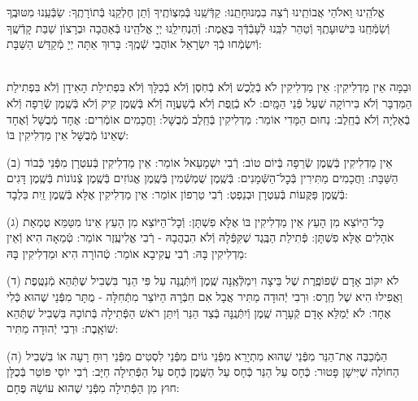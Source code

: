 \documentclass[twoside, openany, parskip=half, 11pt]{book}
\begin{document}
אֱלֹהֵֽינוּ וֵאלֹהֵי אֲבוֹתֵֽינוּ רְֿצֵה בִמְנוּחָתֵֽנוּ: קַדְּֿשֵֽׁנוּ בְּֿמִצְוֹתֶֽיךָ וְֿתֵן חֶלְקֵֽנוּ בְּֿתוֹרָתֶֽךָ: שַׂבְּֿעֵֽנוּ מִטּוּבֶֽךָ וְֿשַׂמְּֿחֵֽנוּ בִּישׁוּעָתֶֽךָ וְֿטַהֵר לִבֵּֽנוּ לְֿעָבְֿדְּֿךָ בֶּאֱמֶת: וְֿהַנְחִילֵֽנוּ יְיָ אֱלֹהֵֽינוּ בְּֿאַהֲבָה וּבְרָצוֹן שַׁבַּת קָדְֿשֶֽׁךָ וְֿיִשְׂמְֿחוּ בְֿךָ יִשְׂרָאֵל אוֹהֲבֵי שְֿׁמֶֽךָ: בָּרוּךְ אַתָּה יְיָ מְֿקַדֵּשׁ הַשַּׁבָּת:

\fullkaddish




\\
וּבַמָּה אֵין מַדְלִיקִין: אֵין מַדְלִיקִין לֹא בְֿלֶֽכֶשׁ וְֿלֹא בְֿחֹֽסֶן וְֿלֹא בְֿכַלָּךְ וְֿלֹא בִּפְתִילַת הָאִידָן וְֿלֹא בִּפְתִילַת הַמִּדְבָּר וְֿלֹא בִּירוֹקָה שֶׁעַל פְּֿנֵי הַמָּֽיִם: לֹא בְֿזֶֽפֶת וְֿלֹא בְֿשַׁעֲוָה וְֿלֹא בְּֿשֶֽׁמֶן קִיק וְֿלֹא בְּֿשֶֽׁמֶן שְֿׂרֵפָה וְֿלֹא בְֿאַלְיָה וְֿלֹא בְֿחֵֽלֶב: נַחוּם הַמָּדִי אוֹמֵר: מַדְלִיקִין בְּֿחֵֽלֶב מְֿבֻשָּׁל: וַחֲכָמִים אוֹמְֿרִים: אֶחָד מְֿבֻשָּׁל וְֿאֶחָד שֶׁאֵינוֹ מְֿבֻשָּׁל אֵין מַדְלִיקִין בּוֹ:

(ב) אֵין מַדְלִיקִין בְּֿשֶֽׁמֶן שְֿׂרֵפָה בְּֿיוֹם טוֹב: רְֿבִי יִשְׁמָעֵאל אוֹמֵר: אֵין מַדְלִיקִין בְּֿעִטְרָן מִפְּֿנֵי כְּֿבוֹד הַשַּׁבָּת: וַחֲכָמִים מַתִּירִין בְּֿכׇל־הַשְּֿׁמָנִים: בְּֿשֶֽׁמֶן שֻׁמְשְֿׁמִין בְּֿשֶֽׁמֶן אֱגוֹזִים בְּֿשֶֽׁמֶן צְֿנוֹנוֹת בְּֿשֶֽׁמֶן דָּגִים בְּֿשֶֽׁמֶן פַּקֻּעוֹת בְּֿעִטְרָן וּבְנֵפְטְ: רְֿבִי טַרְפוֹן אוֹמֵר: אֵין מַדְלִיקִין אֶלָּא בְּֿשֶֽׁמֶן זַֽיִת בִּלְבָד:

(ג) כׇּל־הַיּוֹצֵא מִן הָעֵץ אֵין מַדְלִיקִין בּוֹ אֶלָּא פִשְׁתָּן: וְֿכׇל־הַיּוֹצֵא מִן הָעֵץ אֵינוֹ מִטַּמֵּא טֻמְאַת אֹהָלִים אֶלָּא פִשְׁתָּן: פְּֿתִילַת הַבֶּֽגֶד שֶׁקִּפְּֿלָהּ וְֿלֹא הִבְהֲבָהּ - רְֿבִי אֱלִיעֶֽזֶר אוֹמֵר: טְֿמֵאָה הִיא וְֿאֵין מַדְלִיקִין בָּהּ: רְֿבִי עֲקִיבָא אוֹמֵר: טְֿהוֹרָה הִיא וּמַדְלִיקִין בָּהּ:

(ד) לֹא יִקּוֹב אָדָם שְֿׁפוֹפֶֽרֶת שֶׁל בֵּיצָה וִימַלְּֿאֶֽנָּה שֶֽׁמֶן וְֿיִתְּֿנֶֽנָּה עַל פִּי הַנֵּר בִּשְׁבִיל שֶׁתְּֿהֵא מְֿנַטֶּֽפֶת וַאֲפִילוּ הִיא שֶׁל חֶֽרֶס: וּרְבִי יְֿהוּדָה מַתִּיר אֲבָל אִם חִבְּֿרָהּ הַיּוֹצֵר מִתְּֿחִלָּה - מֻתָּר מִפְּֿנֵי שֶׁהוּא כְּֿלִי אֶחָד: לֹא יְֿמַלֵּא אָדָם קְֿעָרָה שֶֽׁמֶן וְֿיִתְּֿנֶֽנָּה בְּֿצַד הַנֵּר וְֿיִתֵּן רֹאשׁ הַפְּֿתִילָה בְּֿתוֹכָהּ בִּשְׁבִיל שֶׁתְּֿהֵא שׁוֹאָֽבֶת: וּרְבִי יְֿהוּדָה מַתִּיר:

(ה) הַמְֿכַבֶּה אֶת־הַנֵּר מִפְּֿנֵי שֶׁהוּא מִתְיָרֵא מִפְּֿנֵי גוֹיִם מִפְּֿנֵי לִסְטִים מִפְּֿנֵי רֽוּחַ רָעָה אוֹ בִּשְׁבִיל הַחוֹלֶה שֶׁיִּישָׁן פָּטוּר: כְּֿחָס עַל הַנֵּר כְּֿחָס עַל הַשֶּֽׁמֶן כְּֿחָס עַל הַפְּֿתִילָה חַיָּב: רְֿבִי יוֹסֵי פּוֹטֵר בְּֿכֻלָּן חוּץ מִן הַפְּֿתִילָה מִפְּֿנֵי שֶׁהוּא עוֹשָׂהּ פֶּחָם:
\end{document}
